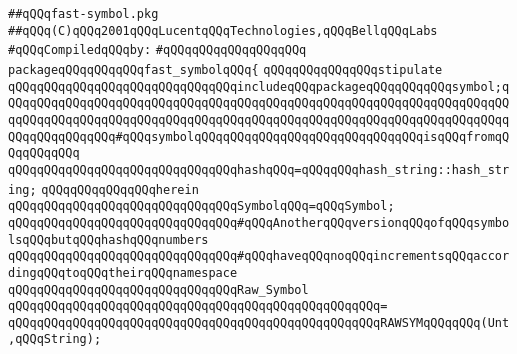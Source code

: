 \label{src/lib/compiler/front/basics/map/fast-symbol.pkg}
\verb|##qQQqfast-symbol.pkg|\newline
\verb|##qQQq(C)qQQq2001qQQqLucentqQQqTechnologies,qQQqBellqQQqLabs|\newline
\newline
\verb|#qQQqCompiledqQQqby:|\newline
\verb|#qQQqqQQqqQQqqQQqqQQq|\newline
\newline
\newline
\newline
\verb|packageqQQqqQQqqQQqfast_symbolqQQq{|\newline
\newline
\verb|qQQqqQQqqQQqqQQqstipulate|\newline
\newline
\verb|qQQqqQQqqQQqqQQqqQQqqQQqqQQqqQQqincludeqQQqpackageqQQqqQQqqQQqsymbol;qQQqqQQqqQQqqQQqqQQqqQQqqQQqqQQqqQQqqQQqqQQqqQQqqQQqqQQqqQQqqQQqqQQqqQQqqQQqqQQqqQQqqQQqqQQqqQQqqQQqqQQqqQQqqQQqqQQqqQQqqQQqqQQqqQQqqQQqqQQqqQQqqQQqqQQqqQQq#qQQqsymbolqQQqqQQqqQQqqQQqqQQqqQQqqQQqqQQqisqQQqfromqQQqqQQqqQQq|\newline
\newline
\verb|qQQqqQQqqQQqqQQqqQQqqQQqqQQqqQQqhashqQQq=qQQqqQQqhash_string::hash_string;|\newline
\verb|qQQqqQQqqQQqqQQqherein|\newline
\newline
\verb|qQQqqQQqqQQqqQQqqQQqqQQqqQQqqQQqSymbolqQQq=qQQqSymbol;|\newline
\newline
\verb|qQQqqQQqqQQqqQQqqQQqqQQqqQQqqQQq#qQQqAnotherqQQqversionqQQqofqQQqsymbolsqQQqbutqQQqhashqQQqnumbers|\newline
\verb|qQQqqQQqqQQqqQQqqQQqqQQqqQQqqQQq#qQQqhaveqQQqnoqQQqincrementsqQQqaccordingqQQqtoqQQqtheirqQQqnamespace|\newline
\newline
\verb|qQQqqQQqqQQqqQQqqQQqqQQqqQQqqQQqRaw_Symbol|\newline
\verb|qQQqqQQqqQQqqQQqqQQqqQQqqQQqqQQqqQQqqQQqqQQqqQQqqQQq=|\newline
\verb|qQQqqQQqqQQqqQQqqQQqqQQqqQQqqQQqqQQqqQQqqQQqqQQqqQQqRAWSYMqQQqqQQq(Unt,qQQqString);|\newline
